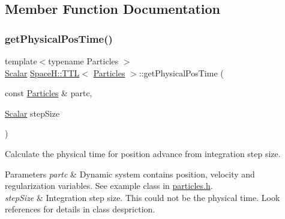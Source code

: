 \subsection{Member Function Documentation}
\mbox{\label{class_space_h_1_1_t_t_l_a98eae0c137d47ead0c1483521443b5d7}} 
\subsubsection{\texorpdfstring{get\+Physical\+Pos\+Time()}{getPhysicalPosTime()}}
{\footnotesize\ttfamily template$<$typename Particles $>$ \\
\mbox{\hyperlink{class_space_h_1_1_t_t_l_a8d0bb489470e6da1bcaf70a9eb38d96d}{Scalar}} \mbox{\hyperlink{class_space_h_1_1_t_t_l}{Space\+H\+::\+T\+TL}}$<$ \mbox{\hyperlink{struct_space_h_1_1_particles}{Particles}} $>$\+::get\+Physical\+Pos\+Time (\begin{DoxyParamCaption}\item[{const \mbox{\hyperlink{struct_space_h_1_1_particles}{Particles}} \&}]{partc,  }\item[{\mbox{\hyperlink{class_space_h_1_1_t_t_l_a8d0bb489470e6da1bcaf70a9eb38d96d}{Scalar}}}]{step\+Size }\end{DoxyParamCaption})\hspace{0.3cm}{\ttfamily [inline]}}



Calculate the physical time for position advance from integration step size. 


\begin{DoxyParams}{Parameters}
{\em partc} & Dynamic system contains position, velocity and regularization variables. See example class in \mbox{\hyperlink{particles_8h}{particles.\+h}}. \\
\hline
{\em step\+Size} & Integration step size. This could not be the physical time. Look references for details in class despriction. \\
\hline
\end{DoxyParams}
\mbox{\label{class_space_h_1_1_t_t_l_aa98edc3ecfab76e612b9e77f64c08865}} 
